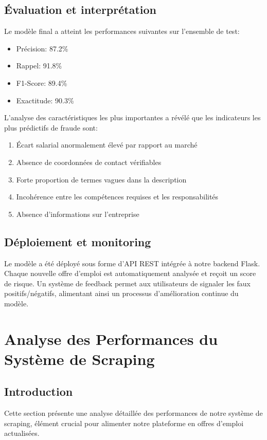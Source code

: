 \documentclass[10pt,a4paper,twocolumn]{article}
\begin{document}
\subsection{Évaluation et interprétation}
Le modèle final a atteint les performances suivantes sur l'ensemble de test:
\begin{itemize}
    \item Précision: 87.2\%
    \item Rappel: 91.8\%
    \item F1-Score: 89.4\%
    \item Exactitude: 90.3\%
\end{itemize}

L'analyse des caractéristiques les plus importantes a révélé que les indicateurs les plus prédictifs de fraude sont:
\begin{enumerate}
    \item Écart salarial anormalement élevé par rapport au marché
    \item Absence de coordonnées de contact vérifiables
    \item Forte proportion de termes vagues dans la description
    \item Incohérence entre les compétences requises et les responsabilités
    \item Absence d'informations sur l'entreprise
\end{enumerate}

\subsection{Déploiement et monitoring}
Le modèle a été déployé sous forme d'API REST intégrée à notre backend Flask. Chaque nouvelle offre d'emploi est automatiquement analysée et reçoit un score de risque. Un système de feedback permet aux utilisateurs de signaler les faux positifs/négatifs, alimentant ainsi un processus d'amélioration continue du modèle.

\section{Analyse des Performances du Système de Scraping}
\subsection{Introduction}
Cette section présente une analyse détaillée des performances de notre système de scraping, élément crucial pour alimenter notre plateforme en offres d'emploi actualisées.
\end{document}
